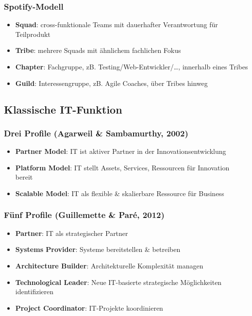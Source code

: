 \documentclass{article}
\begin{document}
\subsubsection{Spotify-Modell}
\begin{itemize}
  \item \textbf{Squad}: cross-funktionale Teams mit dauerhafter Verantwortung für Teilprodukt
  \item \textbf{Tribe}: mehrere Squads mit ähnlichem fachlichen Fokus
  \item \textbf{Chapter}: Fachgruppe, zB. Testing/Web-Entwickler/…, innerhalb eines Tribes
  \item \textbf{Guild}: Interessengruppe, zB. Agile Coaches, über Tribes hinweg
\end{itemize}

\subsection{Klassische IT-Funktion}
\subsubsection{Drei Profile (Agarweil \& Sambamurthy, 2002)}
\begin{itemize}
  \item \textbf{Partner Model}: IT ist aktiver Partner in der Innovationsentwicklung
  \item \textbf{Platform Model}: IT stellt Assets, Services, Ressourcen für Innovation bereit
  \item \textbf{Scalable Model}: IT als flexible \& skalierbare Ressource für Business
\end{itemize}

\subsubsection{Fünf Profile (Guillemette \& Paré, 2012)}
\begin{itemize}
  \item \textbf{Partner}: IT als strategischer Partner
  \item \textbf{Systems Provider}: Systeme bereitstellen \& betreiben
  \item \textbf{Architecture Builder}: Architekturelle Komplexität managen
  \item \textbf{Technological Leader}: Neue IT-basierte strategische Möglichkeiten identifizieren
  \item \textbf{Project Coordinator}: IT-Projekte koordinieren
\end{itemize}
\end{document}
